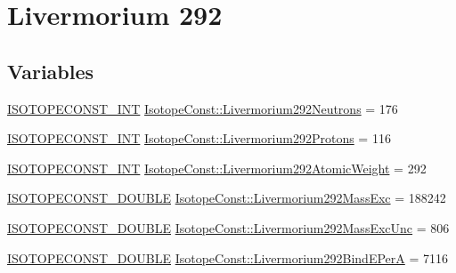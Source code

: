 \hypertarget{group___isotope_const-_livermorium-_lv292}{}\section{Livermorium 292}
\label{group___isotope_const-_livermorium-_lv292}
\subsection*{Variables}
\begin{DoxyCompactItemize}
\item 
\mbox{\hyperlink{group___isotope_const-_macros_ga5f18360b3e99483a35c32d789e62621c}{I\+S\+O\+T\+O\+P\+E\+C\+O\+N\+S\+T\+\_\+\+I\+NT}} \mbox{\hyperlink{group___isotope_const-_livermorium-_lv292_ga9e1694d2075b9dbede2fdb6b9eb3dbd0}{Isotope\+Const\+::\+Livermorium292\+Neutrons}} = 176
\item 
\mbox{\hyperlink{group___isotope_const-_macros_ga5f18360b3e99483a35c32d789e62621c}{I\+S\+O\+T\+O\+P\+E\+C\+O\+N\+S\+T\+\_\+\+I\+NT}} \mbox{\hyperlink{group___isotope_const-_livermorium-_lv292_ga8afe7b9288d938247c0c8bb17333a564}{Isotope\+Const\+::\+Livermorium292\+Protons}} = 116
\item 
\mbox{\hyperlink{group___isotope_const-_macros_ga5f18360b3e99483a35c32d789e62621c}{I\+S\+O\+T\+O\+P\+E\+C\+O\+N\+S\+T\+\_\+\+I\+NT}} \mbox{\hyperlink{group___isotope_const-_livermorium-_lv292_gad8e15296dd0305aaafa37f8c9658aad8}{Isotope\+Const\+::\+Livermorium292\+Atomic\+Weight}} = 292
\item 
\mbox{\hyperlink{group___isotope_const-_macros_ga8f45a7272ce02c0b4c65c44636ed719a}{I\+S\+O\+T\+O\+P\+E\+C\+O\+N\+S\+T\+\_\+\+D\+O\+U\+B\+LE}} \mbox{\hyperlink{group___isotope_const-_livermorium-_lv292_ga80b8b4c258ce8474ae72d65b348e8495}{Isotope\+Const\+::\+Livermorium292\+Mass\+Exc}} = 188242
\item 
\mbox{\hyperlink{group___isotope_const-_macros_ga8f45a7272ce02c0b4c65c44636ed719a}{I\+S\+O\+T\+O\+P\+E\+C\+O\+N\+S\+T\+\_\+\+D\+O\+U\+B\+LE}} \mbox{\hyperlink{group___isotope_const-_livermorium-_lv292_ga2ba40f9cf0fa19c453a9a75420d63a63}{Isotope\+Const\+::\+Livermorium292\+Mass\+Exc\+Unc}} = 806
\item 
\mbox{\hyperlink{group___isotope_const-_macros_ga8f45a7272ce02c0b4c65c44636ed719a}{I\+S\+O\+T\+O\+P\+E\+C\+O\+N\+S\+T\+\_\+\+D\+O\+U\+B\+LE}} \mbox{\hyperlink{group___isotope_const-_livermorium-_lv292_ga8287af3d4d3f995434668c59aed84e2b}{Isotope\+Const\+::\+Livermorium292\+Bind\+E\+PerA}} = 7116

\end{DoxyCompactItemize}
